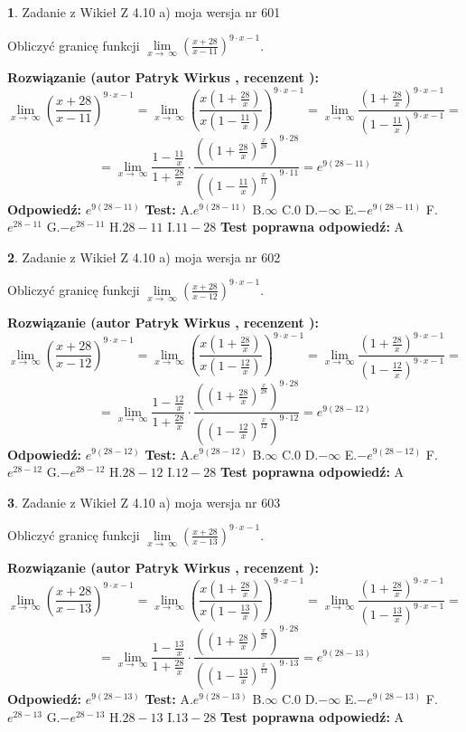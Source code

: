 \documentclass[12pt, a4paper]{article}
\theoremstyle{definition} %
\newtheorem{zad}{}
\newcommand{\zadStart}[1]{\begin{zad}#1\newline}
\newcommand{\zadStop}{\end{zad}}
\newcommand{\rozwStart}[2]{\noindent \textbf{Rozwiązanie (autor #1 , recenzent #2): }\newline}
\newcommand{\rozwStop}{\newline}
\newcommand{\odpStart}{\noindent \textbf{Odpowiedź:}\newline}
\newcommand{\odpStop}{\newline}
\newcommand{\testStart}{\noindent \textbf{Test:}\newline}
\newcommand{\testStop}{\newline}
\newcommand{\kluczStart}{\noindent \textbf{Test poprawna odpowiedź:}\newline}
\newcommand{\kluczStop}{\newline}
\begin{document}
\zadStart{Zadanie z Wikieł Z 4.10 a) moja wersja nr 601}


Obliczyć granicę funkcji  $\lim\limits_{x\to\ \infty}(\frac{x+28}{x-11})^{9\cdot x-1}$.
\zadStop
\rozwStart{Patryk Wirkus}{}
$$\lim\limits_{x\to\ \infty}(\frac{x+28}{x-11})^{9\cdot x-1} = \lim\limits_{x\to\ \infty}(\frac{x(1+\frac{28}{x})}{x(1-\frac{11}{x})})^{9\cdot x-1}=\lim\limits_{x\to\ \infty}\frac{(1+\frac{28}{x})^{9\cdot x-1}}{(1-\frac{11}{x})^{9\cdot x-1}}=$$
$$=\lim\limits_{x\to\ \infty}\frac{1-\frac{11}{x}}{1+\frac{28}{x}}\cdot\frac{((1+\frac{28}{x})^{\frac{x}{28}})^{9\cdot28}}{((1-\frac{11}{x})^{\frac{x}{11}})^{9\cdot11}}=e^{9(28-11)}$$
\rozwStop
\odpStart
$e^{9(28-11)}$
\odpStop
\testStart
A.$e^{9(28-11)}$ B.$\infty$ C.$0$ D.$-\infty$ E.$-e^{9(28-11)}$
F.$e^{28-11}$ G.$-e^{28-11}$
H.$28-11$
I.$11-28$
\testStop
\kluczStart
A
\kluczStop



\zadStart{Zadanie z Wikieł Z 4.10 a) moja wersja nr 602}


Obliczyć granicę funkcji  $\lim\limits_{x\to\ \infty}(\frac{x+28}{x-12})^{9\cdot x-1}$.
\zadStop
\rozwStart{Patryk Wirkus}{}
$$\lim\limits_{x\to\ \infty}(\frac{x+28}{x-12})^{9\cdot x-1} = \lim\limits_{x\to\ \infty}(\frac{x(1+\frac{28}{x})}{x(1-\frac{12}{x})})^{9\cdot x-1}=\lim\limits_{x\to\ \infty}\frac{(1+\frac{28}{x})^{9\cdot x-1}}{(1-\frac{12}{x})^{9\cdot x-1}}=$$
$$=\lim\limits_{x\to\ \infty}\frac{1-\frac{12}{x}}{1+\frac{28}{x}}\cdot\frac{((1+\frac{28}{x})^{\frac{x}{28}})^{9\cdot28}}{((1-\frac{12}{x})^{\frac{x}{12}})^{9\cdot12}}=e^{9(28-12)}$$
\rozwStop
\odpStart
$e^{9(28-12)}$
\odpStop
\testStart
A.$e^{9(28-12)}$ B.$\infty$ C.$0$ D.$-\infty$ E.$-e^{9(28-12)}$
F.$e^{28-12}$ G.$-e^{28-12}$
H.$28-12$
I.$12-28$
\testStop
\kluczStart
A
\kluczStop



\zadStart{Zadanie z Wikieł Z 4.10 a) moja wersja nr 603}


Obliczyć granicę funkcji  $\lim\limits_{x\to\ \infty}(\frac{x+28}{x-13})^{9\cdot x-1}$.
\zadStop
\rozwStart{Patryk Wirkus}{}
$$\lim\limits_{x\to\ \infty}(\frac{x+28}{x-13})^{9\cdot x-1} = \lim\limits_{x\to\ \infty}(\frac{x(1+\frac{28}{x})}{x(1-\frac{13}{x})})^{9\cdot x-1}=\lim\limits_{x\to\ \infty}\frac{(1+\frac{28}{x})^{9\cdot x-1}}{(1-\frac{13}{x})^{9\cdot x-1}}=$$
$$=\lim\limits_{x\to\ \infty}\frac{1-\frac{13}{x}}{1+\frac{28}{x}}\cdot\frac{((1+\frac{28}{x})^{\frac{x}{28}})^{9\cdot28}}{((1-\frac{13}{x})^{\frac{x}{13}})^{9\cdot13}}=e^{9(28-13)}$$
\rozwStop
\odpStart
$e^{9(28-13)}$
\odpStop
\testStart
A.$e^{9(28-13)}$ B.$\infty$ C.$0$ D.$-\infty$ E.$-e^{9(28-13)}$
F.$e^{28-13}$ G.$-e^{28-13}$
H.$28-13$
I.$13-28$
\testStop
\kluczStart
A
\kluczStop
\end{document}

